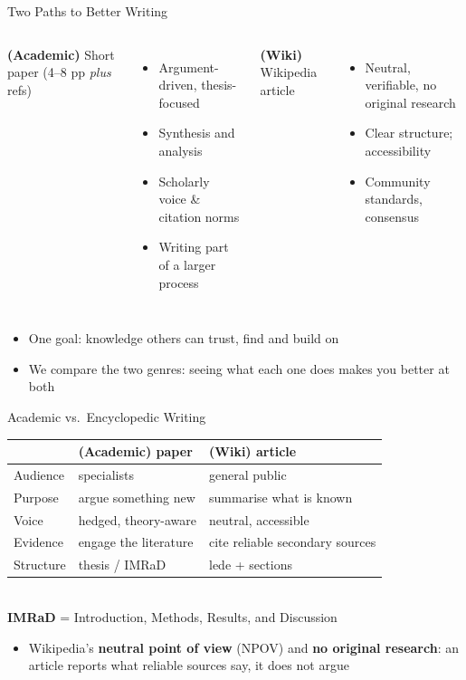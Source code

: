 \documentclass[aspectratio=169]{beamer}
\begin{document}
\begin{frame}{Two Paths to Better Writing}
\begin{columns}[T,onlytextwidth]
\textbf{(Academic)} Short paper (4--8 pp \emph{plus} refs)
\begin{itemize}
  \item Argument-driven, thesis-focused
  \item Synthesis and analysis
  \item Scholarly voice \& citation norms
  \item Writing part of a larger process
\end{itemize}

\textbf{(Wiki)} Wikipedia article
\begin{itemize}
  \item Neutral, verifiable, no original research
  \item Clear structure; accessibility
  \item Community standards, consensus
\end{itemize}
\end{columns}

\vspace{3ex}
\begin{itemize}
  \item One goal: knowledge others can trust, find and build on
  \item We compare the two genres: seeing what each one does makes you better at both
\end{itemize}
\end{frame}

\begin{frame}{Academic vs.\ Encyclopedic Writing}
\begin{center}
\small
\begin{tabular}{@{}lll@{}}
\toprule
           & \textbf{(Academic) paper}    & \textbf{(Wiki) article} \\
\midrule
Audience   & specialists                  & general public \\
Purpose    & argue something new          & summarise what is known \\
Voice      & hedged, theory-aware         & neutral, accessible \\
Evidence   & engage the literature        & cite reliable secondary sources \\
Structure  & thesis / IMRaD               & lede + sections \\
\bottomrule
\end{tabular}
\\[1ex]
{\small \textbf{IMRaD} = Introduction, Methods, Results, and Discussion}
\end{center}
\vspace{1ex}
\begin{itemize}
  \item Wikipedia's \textbf{neutral point of view} (NPOV) and \textbf{no
    original research}: an article reports what reliable sources say, it does
    not argue
\end{itemize}
\end{frame}
\end{document}
